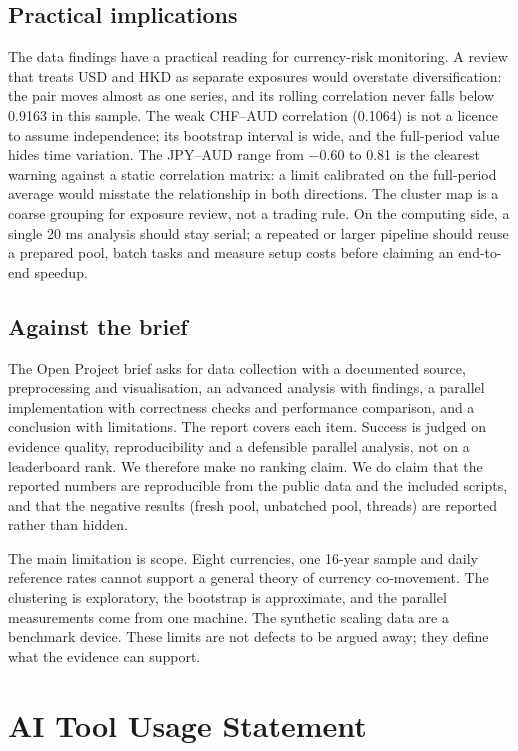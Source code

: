 \documentclass[journal]{IEEEtran}
\begin{document}
\subsection{Practical implications}
The data findings have a practical reading for currency-risk monitoring. A review that treats USD and HKD as separate exposures would overstate diversification: the pair moves almost as one series, and its rolling correlation never falls below 0.9163 in this sample. The weak CHF--AUD correlation (0.1064) is not a licence to assume independence; its bootstrap interval is wide, and the full-period value hides time variation. The JPY--AUD range from $-0.60$ to 0.81 is the clearest warning against a static correlation matrix: a limit calibrated on the full-period average would misstate the relationship in both directions. The cluster map is a coarse grouping for exposure review, not a trading rule. On the computing side, a single 20 ms analysis should stay serial; a repeated or larger pipeline should reuse a prepared pool, batch tasks and measure setup costs before claiming an end-to-end speedup.

\subsection{Against the brief}
The Open Project brief asks for data collection with a documented source, preprocessing and visualisation, an advanced analysis with findings, a parallel implementation with correctness checks and performance comparison, and a conclusion with limitations. The report covers each item. Success is judged on evidence quality, reproducibility and a defensible parallel analysis, not on a leaderboard rank. We therefore make no ranking claim. We do claim that the reported numbers are reproducible from the public data and the included scripts, and that the negative results (fresh pool, unbatched pool, threads) are reported rather than hidden.

The main limitation is scope. Eight currencies, one 16-year sample and daily reference rates cannot support a general theory of currency co-movement. The clustering is exploratory, the bootstrap is approximate, and the parallel measurements come from one machine. The synthetic scaling data are a benchmark device. These limits are not defects to be argued away; they define what the evidence can support.

\section{AI Tool Usage Statement}
\label{sec:ai}
\end{document}
